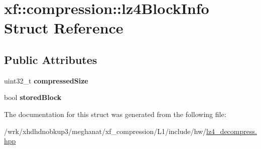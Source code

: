 \hypertarget{structxf_1_1compression_1_1lz4BlockInfo}{\section{xf\-:\-:compression\-:\-:lz4\-Block\-Info Struct Reference}
\label{structxf_1_1compression_1_1lz4BlockInfo}
}
\subsection*{Public Attributes}
\begin{DoxyCompactItemize}
\item 
\hypertarget{structxf_1_1compression_1_1lz4BlockInfo_afc520ad8a6b4a9434287649dd1483082}{uint32\-\_\-t {\bfseries compressed\-Size}}\label{structxf_1_1compression_1_1lz4BlockInfo_afc520ad8a6b4a9434287649dd1483082}

\item 
\hypertarget{structxf_1_1compression_1_1lz4BlockInfo_ae4eeb5bf41943f51a3db3e2bf569d742}{bool {\bfseries stored\-Block}}\label{structxf_1_1compression_1_1lz4BlockInfo_ae4eeb5bf41943f51a3db3e2bf569d742}

\end{DoxyCompactItemize}


The documentation for this struct was generated from the following file\-:\begin{DoxyCompactItemize}
\item 
/wrk/xhdhdnobkup3/meghanat/xf\-\_\-compression/\-L1/include/hw/\hyperlink{lz4__decompress_8hpp}{lz4\-\_\-decompress.\-hpp}\end{DoxyCompactItemize}
